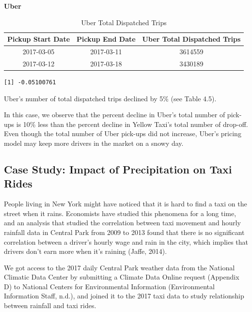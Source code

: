 \documentclass[12pt,twoside]{reedthesis}
\theoremstyle{definition}
\theoremstyle{definition}
\theoremstyle{definition}
\theoremstyle{remark}
\begin{document}
\textbf{Uber}
\begin{table}

\caption{\label{tab:unnamed-chunk-70}Uber Total Dispatched Trips}
\centering
\begin{tabular}[t]{ccc}
\toprule
Pickup Start Date & Pickup End Date & Uber Total Dispatched Trips\\
\midrule
2017-03-05 & 2017-03-11 & 3614559\\
2017-03-12 & 2017-03-18 & 3430189\\
\bottomrule
\end{tabular}
\end{table}
\begin{verbatim}
[1] -0.05100761
\end{verbatim}
Uber's number of total dispatched trips declined by 5\% (see Table 4.5).

In this case, we observe that the percent decline in Uber's total number
of pick-ups is 10\% less than the percent decline in Yellow Taxi's total
number of drop-off. Even though the total number of Uber pick-ups did
not increase, Uber's pricing model may keep more drivers in the market
on a snowy day.

\subsection{Case Study: Impact of Precipitation on Taxi
Rides}\label{case-study-impact-of-precipitation-on-taxi-rides}

People living in New York might have noticed that it is hard to find a
taxi on the street when it rains. Economists have studied this phenomena
for a long time, and an analysis that studied the correlation between
taxi movement and hourly rainfall data in Central Park from 2009 to 2013
found that there is no significant correlation between a driver's hourly
wage and rain in the city, which implies that drivers don't earn more
when it's raining (Jaffe, 2014).

We got access to the 2017 daily Central Park weather data from the
National Climatic Data Center by submitting a Climate Data Online
request (Appendix D) to National Centers for Environmental Information
(Environmental Information Staff, n.d.), and joined it to the 2017 taxi
data to study relationship between rainfall and taxi rides.
\end{document}
